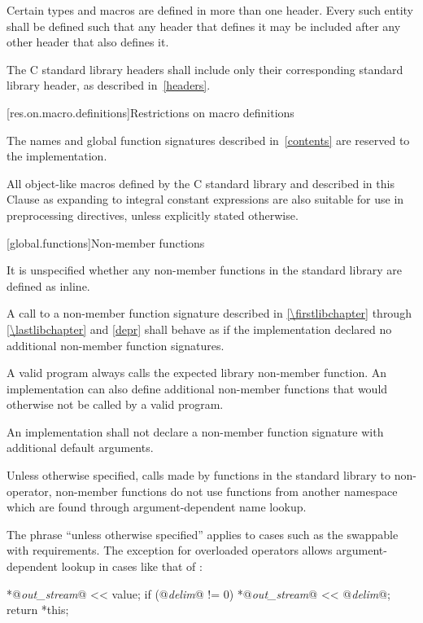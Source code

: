 \pnum
Certain types and macros are defined in more than one header.
Every such entity shall be defined such that any header that defines it may be
included after any other header that also defines it.

\pnum
The C standard library headers
shall include only their corresponding \Cpp{} standard library header,
as described in~\ref{headers}.

[res.on.macro.definitions]{Restrictions on macro definitions}
%

\pnum
The names and global function signatures described in~\ref{contents} are
reserved to the implementation.
%
%
%
%
%

\pnum
All object-like macros defined by the C standard library and described in this
Clause as expanding to integral constant expressions are also suitable for use
in  preprocessing directives, unless
explicitly stated otherwise.

[global.functions]{Non-member functions}

\pnum
It is unspecified whether any
non-member
functions in the \Cpp{} standard library are defined as
inline.

\pnum
A call to a non-member function signature
described in \ref{\firstlibchapter} through \ref{\lastlibchapter} and
\ref{depr} shall behave as if the implementation declared no additional
non-member function signatures.
\begin{footnote}
A valid \Cpp{} program always
calls the expected library non-member function. An implementation can
also define additional non-member functions that would otherwise not
be called by a valid \Cpp{} program.
\end{footnote}

\pnum
An implementation shall not declare a non-member function signature
with additional default arguments.

\pnum
Unless otherwise specified,
calls made by functions in the standard library to non-operator, non-member functions
do not use functions from another namespace which are found through
argument-dependent name lookup.
\begin{note}
The phrase ``unless otherwise specified'' applies to cases such as
the swappable with requirements.
The exception for overloaded operators allows argument-dependent lookup
in cases like that of
:

\effects
\begin{codeblock}
*@\textit{out_stream}@ << value;
if (@\textit{delim}@ != 0)
  *@\textit{out_stream}@ << @\textit{delim}@;
return *this;
\end{codeblock}
\end{note}

